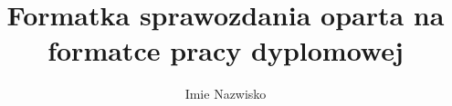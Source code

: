 \documentclass[
    bindingoffset=5mm,  %
    footnoteindent=3mm, %
    hyphenation=true    %
]{src/wut-thesis}
\begin{document}
\title{
		Formatka sprawozdania oparta na formatce pracy dyplomowej
}
\author{Imie Nazwisko}
\date{\the\year}
\maketitle

\clearpage
\tableofcontents

\clearpage
\pagestyle{headings}

%


\clearpage %


\clearpage
\pagestyle{plain}

\listoffigurestoc    %




\end{document}
